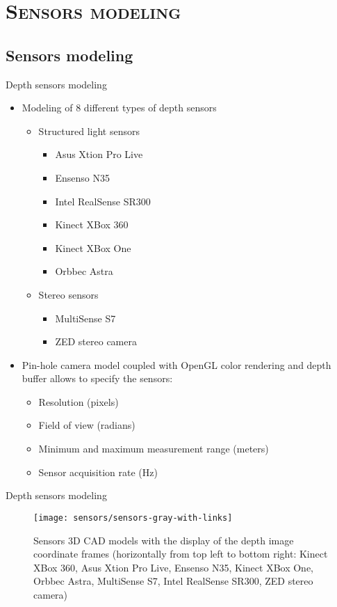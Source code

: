 \section{\scshape Sensors modeling}
\subsection*{Sensors modeling}
\begin{frame}{Depth sensors modeling}
	\begin{itemize}
		\item Modeling of 8 different types of depth sensors
		\begin{itemize}
			\item Structured light sensors
			\begin{itemize}
				\item Asus Xtion Pro Live
				\item Ensenso N35
				\item Intel RealSense SR300
				\item Kinect XBox 360
				\item Kinect XBox One
				\item Orbbec Astra
			\end{itemize}
			\item Stereo sensors
			\begin{itemize}
				\item MultiSense S7
				\item ZED stereo camera
			\end{itemize}
		\end{itemize}
		\item Pin-hole camera model coupled with OpenGL color rendering and depth buffer allows to specify the sensors:
		\begin{itemize}
			\item Resolution (pixels)
			\item Field of view (radians)
			\item Minimum and maximum measurement range (meters)
			\item Sensor acquisition rate (Hz)
		\end{itemize}
	\end{itemize}
\end{frame}


\begin{frame}{Depth sensors modeling}
	\begin{figure}
		\centering
		\texttt{[image: sensors/sensors-gray-with-links]}
		\caption{Sensors 3D CAD models with the display of the depth image coordinate frames (horizontally from top left to bottom right: Kinect XBox 360, Asus Xtion Pro Live, Ensenso N35, Kinect XBox One, Orbbec Astra, MultiSense S7, Intel RealSense SR300, ZED stereo camera)}
	\end{figure}
\end{frame}


